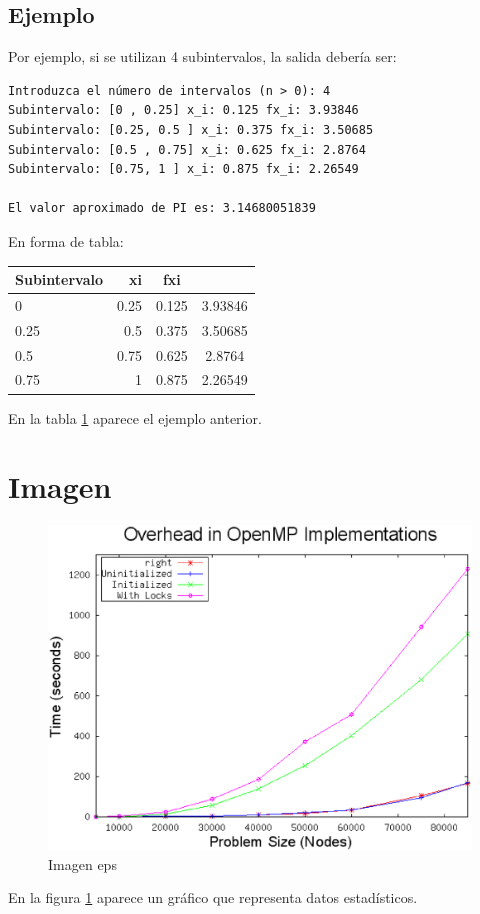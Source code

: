 \documentclass[spanish,a4paper,11pt]{article}
\begin{document}
\subsection{Ejemplo}
Por ejemplo, si se utilizan 4 subintervalos, la salida debería ser: 
\begin{footnotesize}
\begin{verbatim}
Introduzca el número de intervalos (n > 0): 4
Subintervalo: [0 , 0.25] x_i: 0.125 fx_i: 3.93846
Subintervalo: [0.25, 0.5 ] x_i: 0.375 fx_i: 3.50685
Subintervalo: [0.5 , 0.75] x_i: 0.625 fx_i: 2.8764
Subintervalo: [0.75, 1 ] x_i: 0.875 fx_i: 2.26549

El valor aproximado de PI es: 3.14680051839
\end{verbatim}
\end{footnotesize}
En forma de tabla:\\
\cite{latex}
\begin{table}[!h]
\label{Mitabla}
\begin{tabular}{lrcc}
Subintervalo & xi & fxi\\
\hline
0 & 0.25 & 0.125 & 3.93846\\
0.25 & 0.5  & 0.375 & 3.50685\\
0.5 & 0.75 & 0.625 & 2.8764\\
0.75 & 1  & 0.875 & 2.26549\\
\end{tabular}
\end{table}

En la tabla \ref{Mitabla} aparece el ejemplo anterior.


\section{Imagen}
\begin{figure}[h]
\includegraphics[scale=0.5]{figura1.eps}
\caption{Imagen eps}
\label{Mifigura}
\end{figure}

En la figura \ref{Mifigura} aparece un gráfico que representa datos estadísticos.
\end{document}
